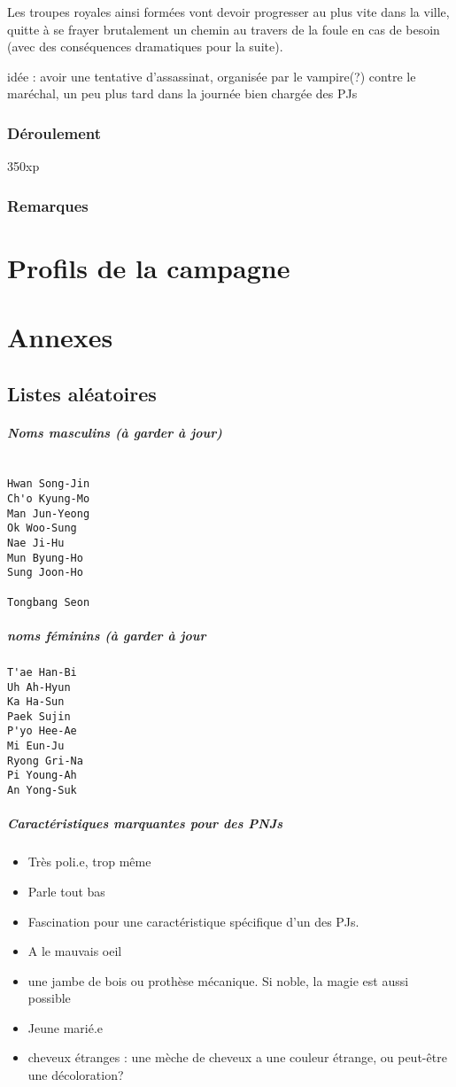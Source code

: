 \documentclass[10pt,a4paper]{book}
\begin{document}
Les troupes royales ainsi formées vont devoir progresser au plus vite dans la ville, quitte à se frayer brutalement un chemin au travers de la foule en cas de besoin (avec des conséquences dramatiques pour la suite).

idée : avoir une tentative d'assassinat, organisée par le vampire(?) contre le maréchal, un peu plus tard dans la journée bien chargée des PJs

\subsection{Déroulement}
350xp
\subsection{Remarques}
\chapter{Profils de la campagne}
\chapter*{Annexes}
\section*{Listes aléatoires}
\paragraph{Noms masculins (à garder à jour)}
\begin{verbatim}

Hwan Song-Jin
Ch'o Kyung-Mo
Man Jun-Yeong
Ok Woo-Sung
Nae Ji-Hu
Mun Byung-Ho
Sung Joon-Ho

Tongbang Seon
\end{verbatim}
\paragraph{noms féminins (à garder à jour}
\begin{verbatim}
T'ae Han-Bi
Uh Ah-Hyun
Ka Ha-Sun
Paek Sujin
P'yo Hee-Ae
Mi Eun-Ju
Ryong Gri-Na
Pi Young-Ah
An Yong-Suk
\end{verbatim}
\paragraph{Caractéristiques marquantes pour des PNJs}
\begin{itemize}
\item Très poli.e, trop même
\item Parle tout bas
\item Fascination pour une caractéristique spécifique d'un des PJs.
\item A le mauvais oeil
\item une jambe de bois ou prothèse mécanique. Si noble, la magie est aussi possible
\item Jeune marié.e
\item cheveux étranges : une mèche de cheveux a une couleur étrange, ou peut-être une décoloration?
\end{itemize}
\end{document}
